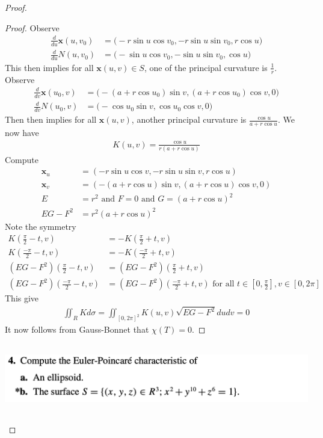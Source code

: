 \documentclass{report}
\begin{document}
\begin{proof}
\begin{proof}
Observe 
\begin{align*}
\frac{d}{du}\textbf{x}(u,v_0)&=\Big(-r\sin u \cos v_0, -r \sin u \sin v_0, r \cos u \Big)\\
\frac{d}{du}N(u,v_0)&=\Big(-\sin u \cos v_0, -\sin u \sin v_0, \cos u\Big)
\end{align*}
This then implies for all $\textbf{x}(u,v)\in S$, one of the principal curvature is $\frac{1}{r}$.\\

Observe 
\begin{align*}
\frac{d}{dv}\textbf{x}(u_0,v)&=\Big( -(a+r\cos u_0)\sin v, (a+r \cos u_0) \cos v, 0 \Big)\\
\frac{d}{dv}N(u_0,v)&= \Big( -\cos u_0 \sin v, \cos u_0 \cos v, 0 \Big)
\end{align*}
Then then implies for all $\textbf{x}(u,v)$, another principal curvature is $\frac{\cos u}{a+r \cos u}$. We now have 
\begin{align*}
K(u,v)= \frac{\cos u}{r(a+r \cos u)}
\end{align*}
Compute 
\begin{align*}
\textbf{x}_u&=(-r \sin u \cos v, -r \sin u \sin v, r \cos u)\\
\textbf{x}_v&=(-(a+r\cos u)\sin v, (a+r \cos u)\cos v,0)\\
E&=r^2\text{ and }F=0\text{ and }G=(a+r \cos u)^2\\
EG-F^2&=r^2(a+r\cos u)^2
\end{align*}
Note the symmetry 
\begin{align*}
  K(\frac{\pi}{2}-t,v)&=- K(\frac{\pi}{2}+t,v)\\
  K(\frac{-\pi}{2}-t,v)&=-K(\frac{-\pi}{2}+t,v) \\
  (EG-F^2)(\frac{\pi}{2}-t,v)&=(EG-F^2)(\frac{\pi}{2}+t,v)\\
  (EG-F^2)(\frac{-\pi}{2}-t,v)&=(EG-F^2)(\frac{-\pi}{2}+t,v)\text{ for all $t\in [0, \frac{\pi}{2}],v \in [0,2\pi]$ } 
\end{align*}
This give 
\begin{align*}
\iint_R Kd\sigma =\iint_{[0,2\pi]^2} K(u,v)\sqrt{EG-F^2} dudv =0
\end{align*}
It now follows from Gauss-Bonnet that $\chi(T)=0$. 
\end{proof}
\begin{question}{}{}
\includegraphics[height=3cm,width=18cm]{hw79}

\end{question}
\end{proof}
\end{document}
